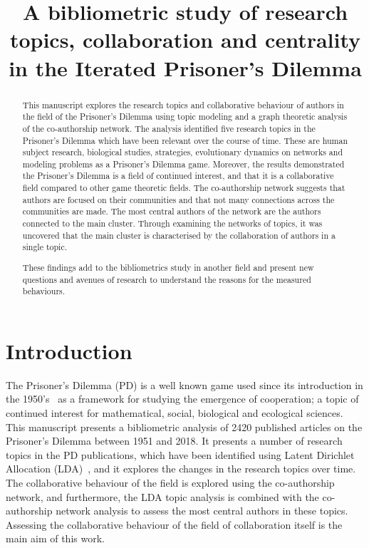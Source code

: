 \documentclass{article}
\title{A bibliometric study of research topics, collaboration and centrality 
       in the Iterated Prisoner's Dilemma}
\author{}
\theoremstyle{definition}
\begin{document}
\maketitle

\begin{abstract}
This manuscript explores the research topics and collaborative behaviour of
authors in the field of the Prisoner's Dilemma using topic modeling and a graph
theoretic analysis of the co-authorship network. The analysis identified five
research topics in the Prisoner's Dilemma which have been relevant over the course
of time. These are human subject research, biological studies, strategies,
evolutionary dynamics on networks and modeling problems as a Prisoner's Dilemma
game. Moreover, the results demonstrated the Prisoner's Dilemma is a field of
continued interest, and that it is a collaborative field compared to other
game theoretic fields. The co-authorship
network suggests that authors are focused on their communities and that not many
connections across the communities are made. The most central authors of the network
are the authors connected to the main cluster. Through examining the networks
of topics, it was uncovered that the main cluster is characterised by the
collaboration of authors in a single topic.

These findings add to the bibliometrics study in another field and present new questions 
and avenues of research to understand the reasons for the measured behaviours.
\end{abstract}

\section{Introduction}\label{section:introduction}

The Prisoner's Dilemma (PD) is a well known game used since its introduction in
the 1950's~\cite{Flood1958} as a framework for studying the emergence of
cooperation; a topic of continued interest for mathematical,
social, biological and
ecological sciences. This manuscript presents a bibliometric
analysis of 2420 published articles on the Prisoner's Dilemma between 1951 and
2018. It presents a number of research topics in the PD publications, which have been
identified using Latent Dirichlet Allocation (LDA)~\cite{Blei2003}, and it explores the changes in the
research topics over time. The collaborative behaviour of the field is explored
using the co-authorship network, and furthermore, the LDA
topic analysis is combined with the co-authorship network analysis to assess
the most central authors in these topics. Assessing the collaborative
behaviour of the field of collaboration itself is the main aim of this work.
\end{document}
